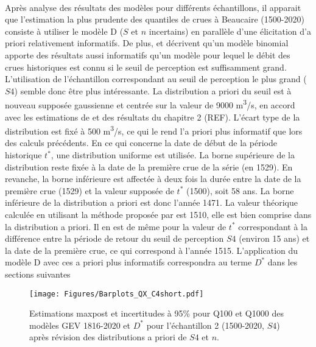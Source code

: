 \documentclass[11pt]{article}
\begin{document}
	\paragraph{} Après analyse des résultats des modèles pour différents échantillons, il apparait que l'estimation la plus prudente des quantiles de crues à Beaucaire (1500-2020) consiste à utiliser le modèle D ($S$ et $n$ incertains) en parallèle d'une élicitation d'a priori relativement informatifs. De plus, \citet{stedinger_flood_1986} et \citet{payrastre_usefulness_2011} décrivent qu'un modèle binomial apporte des résultats aussi informatifs qu'un modèle pour lequel le débit des crues historiques est connu si le seuil de perception est suffisamment grand. L'utilisation de l'échantillon correspondant au seuil de perception le plus grand ($S4$) semble donc être plus intéressante. La distribution a priori du seuil est à nouveau supposée gaussienne et centrée sur la valeur de 9000 m\textsuperscript{3}/s, en accord avec les estimations de \citet{pichard_hydro-climatology_2017} et des résultats du chapitre 2 (REF). L'écart type de la distribution est fixé à 500 m\textsuperscript{3}/s, ce qui le rend l'a priori plus informatif que lors des calculs précédents. En ce qui concerne la date de début de la période historique $t^{*}$, une distribution uniforme est utilisée. La borne supérieure de la distribution reste fixée à la date de la première crue de la série (en 1529). En revanche, la borne inférieure est affectée à deux fois la durée entre la date de la première crue (1529) et la valeur supposée de $t^{*}$ (1500), soit 58 ans. La borne inférieure de la distribution a priori est donc l'année 1471. La valeur théorique calculée en utilisant la méthode proposée par \citet{prosdocimi_german_2018} est 1510, elle est bien comprise dans la distribution a priori. Il en est de même pour la valeur de $t^{*}$ correspondant à la différence entre la période de retour du seuil de perception $S4$ (environ 15 ans) et la date de la première crue, ce qui correspond à l'année 1515. L'application du modèle D avec ces a priori plus informatifs correspondra au terme $D^*$ dans les sections suivantes

	\begin{figure}[h]
		\centering
		\texttt{[image: Figures/Barplots\_QX\_C4short.pdf]}
		\caption{Estimations maxpost et incertitudes à 95\% pour Q100 et Q1000 des modèles GEV 1816-2020 et $D^*$ pour l'échantillon 2 (1500-2020, $S4$) après révision des distributions a priori de $S4$ et $n$.}
		\label{fig:BarplotC4short}
	\end{figure}
\end{document}
